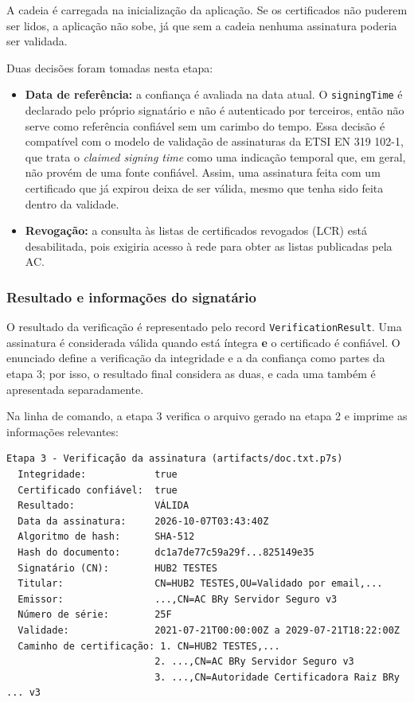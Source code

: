 \documentclass[12pt,a4paper]{article}
\begin{document}
A cadeia é carregada na inicialização da aplicação. Se os certificados não puderem ser lidos, a aplicação não sobe, já que sem a cadeia nenhuma assinatura poderia ser validada.

Duas decisões foram tomadas nesta etapa:

\begin{itemize}
    \item \textbf{Data de referência:} a confiança é avaliada na data atual. O \texttt{signingTime} é declarado pelo próprio signatário e não é autenticado por terceiros, então não serve como referência confiável sem um carimbo do tempo. Essa decisão é compatível com o modelo de validação de assinaturas da ETSI EN 319 102-1, que trata o \textit{claimed signing time} como uma indicação temporal que, em geral, não provém de uma fonte confiável. Assim, uma assinatura feita com um certificado que já expirou deixa de ser válida, mesmo que tenha sido feita dentro da validade.
    \item \textbf{Revogação:} a consulta às listas de certificados revogados (LCR) está desabilitada, pois exigiria acesso à rede para obter as listas publicadas pela AC.
\end{itemize}

\subsubsection{Resultado e informações do signatário}

O resultado da verificação é representado pelo record \texttt{VerificationResult}. Uma assinatura é considerada válida quando está íntegra \textbf{e} o certificado é confiável. O enunciado define a verificação da integridade e a da confiança como partes da etapa 3; por isso, o resultado final considera as duas, e cada uma também é apresentada separadamente.

Na linha de comando, a etapa 3 verifica o arquivo gerado na etapa 2 e imprime as informações relevantes:

\begin{lstlisting}[basicstyle=\ttfamily\footnotesize]
Etapa 3 - Verificação da assinatura (artifacts/doc.txt.p7s)
  Integridade:            true
  Certificado confiável:  true
  Resultado:              VÁLIDA
  Data da assinatura:     2026-10-07T03:43:40Z
  Algoritmo de hash:      SHA-512
  Hash do documento:      dc1a7de77c59a29f...825149e35
  Signatário (CN):        HUB2 TESTES
  Titular:                CN=HUB2 TESTES,OU=Validado por email,...
  Emissor:                ...,CN=AC BRy Servidor Seguro v3
  Número de série:        25F
  Validade:               2021-07-21T00:00:00Z a 2029-07-21T18:22:00Z
  Caminho de certificação: 1. CN=HUB2 TESTES,...
                          2. ...,CN=AC BRy Servidor Seguro v3
                          3. ...,CN=Autoridade Certificadora Raiz BRy ... v3
\end{lstlisting}
\end{document}
